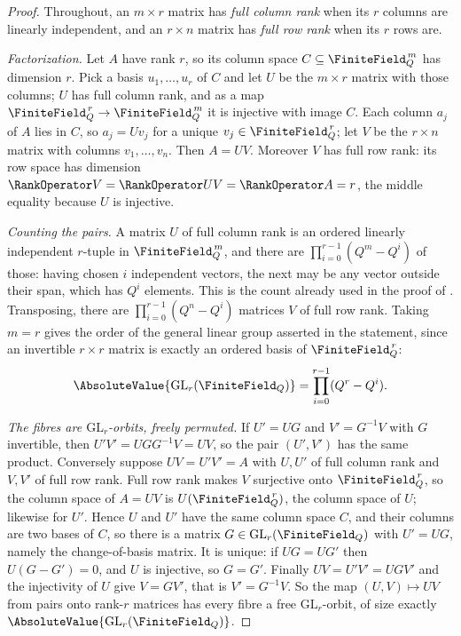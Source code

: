 \documentclass[11pt,a4paper,oneside,openany]{book}
\theoremstyle{definition}
\theoremstyle{remark}
\begin{document}
\begin{proof}
Throughout, an $m\times r$ matrix has \emph{full column rank} when its $r$ columns are linearly
independent, and an $r\times n$ matrix has \emph{full row rank} when its $r$ rows are.

\emph{Factorization.}  Let $A$ have rank $r$, so its column space $C\subseteq\FiniteField_Q^{\,m}$
has dimension $r$.  Pick a basis $u_1,\dots,u_r$ of $C$ and let $U$ be the $m\times r$ matrix with
those columns; $U$ has full column rank, and as a map $\FiniteField_Q^{\,r}\to\FiniteField_Q^{\,m}$
it is injective with image $C$.  Each column $a_j$ of $A$ lies in $C$, so $a_j=Uv_j$ for a unique
$v_j\in\FiniteField_Q^{\,r}$; let $V$ be the $r\times n$ matrix with columns $v_1,\dots,v_n$.  Then
$A=UV$.  Moreover $V$ has full row rank: its row space has dimension
$\RankOperator V=\RankOperator UV=\RankOperator A=r$, the middle equality because
$U$ is injective.

\emph{Counting the pairs.}  A matrix $U$ of full column rank is an ordered linearly independent
$r$-tuple in $\FiniteField_Q^{\,m}$, and there are $\prod_{i=0}^{r-1}(Q^m-Q^i)$ of those: having
chosen $i$ independent vectors, the next may be any vector outside their span, which has $Q^i$
elements.  This is the count already used in the proof of .  Transposing,
there are $\prod_{i=0}^{r-1}(Q^n-Q^i)$ matrices $V$ of full row rank.  Taking $m=r$ gives the order
of the general linear group asserted in the statement, since an invertible $r\times r$ matrix is
exactly an ordered basis of $\FiniteField_Q^{\,r}$:
\[
 \AbsoluteValue{\mathrm{GL}_r(\FiniteField_Q)}=\prod_{i=0}^{r-1}(Q^r-Q^i).
\]

\emph{The fibres are $\mathrm{GL}_r$-orbits, freely permuted.}  If $U'=UG$ and $V'=G^{-1}V$ with
$G$ invertible, then $U'V'=UGG^{-1}V=UV$, so the pair $(U',V')$ has the same product.  Conversely
suppose $UV=U'V'=A$ with $U,U'$ of full column rank and $V,V'$ of full row rank.  Full row rank
makes $V$ surjective onto $\FiniteField_Q^{\,r}$, so the column space of $A=UV$ is
$U(\FiniteField_Q^{\,r})$, the column space of $U$; likewise for $U'$.  Hence $U$ and $U'$ have the
same column space $C$, and their columns are two bases of $C$, so there is a matrix
$G\in\mathrm{GL}_r(\FiniteField_Q)$ with $U'=UG$, namely the change-of-basis matrix.  It is unique:
if $UG=UG'$ then $U(G-G')=0$, and $U$ is injective, so $G=G'$.  Finally $UV=U'V'=UGV'$ and the
injectivity of $U$ give $V=GV'$, that is $V'=G^{-1}V$.  So the map $(U,V)\mapsto UV$ from pairs onto
rank-$r$ matrices has every fibre a free $\mathrm{GL}_r$-orbit, of size exactly
$\AbsoluteValue{\mathrm{GL}_r(\FiniteField_Q)}$.


\end{proof}
\end{document}
